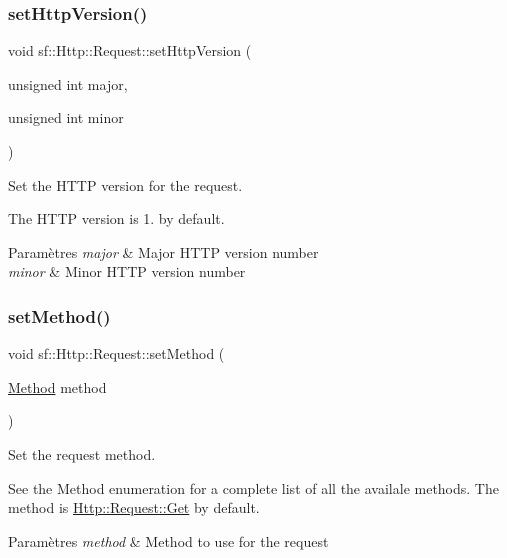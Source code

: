 \subsubsection{\texorpdfstring{set\+Http\+Version()}{setHttpVersion()}}
{\footnotesize\ttfamily void sf\+::\+Http\+::\+Request\+::set\+Http\+Version (\begin{DoxyParamCaption}\item[{unsigned int}]{major,  }\item[{unsigned int}]{minor }\end{DoxyParamCaption})}



Set the H\+T\+TP version for the request. 

The H\+T\+TP version is 1. by default.


\begin{DoxyParams}{Paramètres}
{\em major} & Major H\+T\+TP version number \\
\hline
{\em minor} & Minor H\+T\+TP version number \\
\hline
\end{DoxyParams}
\mbox{\label{classsf_1_1Http_1_1Request_abab148554e873e80d2e41376fde1cb62}} 
\subsubsection{\texorpdfstring{set\+Method()}{setMethod()}}
{\footnotesize\ttfamily void sf\+::\+Http\+::\+Request\+::set\+Method (\begin{DoxyParamCaption}\item[{\hyperlink{classsf_1_1Http_1_1Request_a620f8bff6f43e1378f321bf53fbf5598}{Method}}]{method }\end{DoxyParamCaption})}



Set the request method. 

See the Method enumeration for a complete list of all the availale methods. The method is \hyperlink{classsf_1_1Http_1_1Request_a620f8bff6f43e1378f321bf53fbf5598ab822baed393f3d0353621e5378b9fcb4}{Http\+::\+Request\+::\+Get} by default.


\begin{DoxyParams}{Paramètres}
{\em method} & Method to use for the request \\
\hline
\end{DoxyParams}
\mbox{\label{classsf_1_1Http_1_1Request_a3723de4b4f1a14b744477841c4ac22e6}} 
